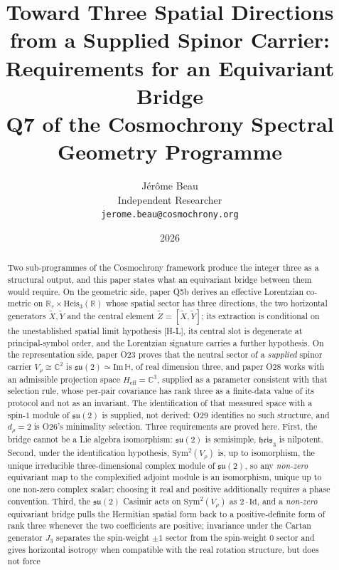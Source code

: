 \documentclass[11pt,a4paper]{article}
\title{Toward Three Spatial Directions from a Supplied Spinor Carrier:\\
Requirements for an Equivariant Bridge\\[4pt]
\large Q7 of the Cosmochrony Spectral Geometry Programme}
\author{J\'er\^ome Beau\\[4pt]
\small Independent Researcher\\
\small \texttt{jerome.beau@cosmochrony.org}}
\date{2026}
\newcommand{\Heis}{\mathrm{Heis}_3}
\newcommand{\Heff}{H_{\mathrm{eff}}}
\newcommand{\ImH}{\mathrm{Im}\,\mathbb{H}}
\newcommand{\su}{\mathfrak{su}}
\newcommand{\heis}{\mathfrak{heis}_3}
\newcommand{\Vr}{V_\rho}
\newcommand{\Sym}{\mathrm{Sym}}
\begin{document}
  \maketitle

  \begin{abstract}
    Two sub-programmes of the Cosmochrony framework produce the integer three as a structural
    output, and this paper states what an equivariant bridge between them would require.
    On the geometric side, paper Q5b derives an effective Lorentzian co-metric on
    $\mathbb{R}_\tau \times \Heis(\mathbb{R})$ whose spatial sector has three directions, the two
    horizontal generators $\tilde X, \tilde Y$ and the central element
    $\tilde Z = [\tilde X, \tilde Y]$; its extraction is conditional on the unestablished spatial
    limit hypothesis [H-L], its central slot is degenerate at principal-symbol order, and the
    Lorentzian signature carries a further hypothesis.
    On the representation side, paper O23 proves that the neutral sector of a \emph{supplied}
    spinor carrier $V_\rho \cong \mathbb{C}^2$ is $\su(2) \simeq \ImH$, of real dimension three,
    and paper O28 works with an admissible projection space $\Heff = \mathbb{C}^3$, supplied as a
    parameter consistent with that selection rule, whose per-pair covariance has rank three as a
    finite-data value of its protocol and not as an invariant.
    The identification of that measured space with a spin-$1$ module of $\su(2)$ is supplied, not
    derived: O29 identifies no such structure, and $d_\rho = 2$ is O26's minimality selection.
    Three requirements are proved here.
    First, the bridge cannot be a Lie algebra isomorphism: $\su(2)$ is semisimple, $\heis$ is
    nilpotent.
    Second, under the identification hypothesis, $\Sym^2(\Vr)$ is, up to isomorphism, the unique
    irreducible three-dimensional complex module of $\su(2)$, so any \emph{non-zero} equivariant
    map to the complexified adjoint module is an isomorphism, unique up to one non-zero complex
    scalar; choosing it real and positive additionally requires a phase convention.
    Third, the $\su(2)$ Casimir acts on $\Sym^2(\Vr)$ as $2 \cdot \mathrm{Id}$, and a \emph{non-zero}
    equivariant bridge pulls the Hermitian spatial form back to a positive-definite form of rank
    three whenever the two coefficients are positive; invariance under the Cartan generator $J_3$ separates the
    spin-weight $\pm 1$
    sector from the spin-weight $0$ sector and
    gives horizontal isotropy when compatible with the real rotation structure, but does not force

\end{abstract}
\end{document}
